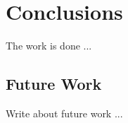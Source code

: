 \chapter{Conclusions}
\label{cha:conclusions}
\vspace{0.5 cm} 

The work is done ...

\vspace{0.5 cm} 
\section{Future Work}
\label{sec:evalres}
\vspace{0.5 cm} 

Write about future work ...
